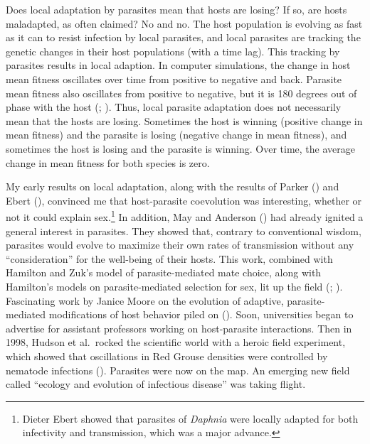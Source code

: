 \documentclass[
  letterpaper,
]{book}
\begin{document}
Does local adaptation by parasites mean that hosts are losing? If so,
are hosts maladapted, as often claimed? No and no. The host population
is evolving as fast as it can to resist infection by local parasites,
and local parasites are tracking the genetic changes in their host
populations (with a time lag). This tracking by parasites results in
local adaption. In computer simulations, the change in host mean fitness
oscillates over time from positive to negative and back. Parasite mean
fitness also oscillates from positive to negative, but it is 180 degrees
out of phase with the host (;
). Thus, local parasite
adaptation does not necessarily mean that the hosts are losing.
Sometimes the host is winning (positive change in mean fitness) and the
parasite is losing (negative change in mean fitness), and sometimes the
host is losing and the parasite is winning. Over time, the average
change in mean fitness for both species is zero.

My early results on local adaptation, along with the results of Parker
() and Ebert
(), convinced me that host-parasite
coevolution was interesting, whether or not it could explain
sex.\footnote{Dieter Ebert showed that parasites of \emph{Daphnia} were
  locally adapted for both infectivity and transmission, which was a
  major advance.} In addition, May and Anderson
() had already ignited a general interest
in parasites. They showed that, contrary to conventional wisdom,
parasites would evolve to maximize their own rates of transmission
without any ``consideration'' for the well-being of their hosts. This
work, combined with Hamilton and Zuk's model of parasite-mediated mate
choice, along with Hamilton's models on parasite-mediated selection for
sex, lit up the field (;
). Fascinating work by
Janice Moore on the evolution of adaptive, parasite-mediated
modifications of host behavior piled on
(). Soon, universities began to advertise
for assistant professors working on host-parasite interactions. Then in
1998, Hudson et al.~rocked the scientific world with a heroic field
experiment, which showed that oscillations in Red Grouse densities were
controlled by nematode infections ().
Parasites were now on the map. An emerging new field called ``ecology
and evolution of infectious disease'' was taking flight.
\end{document}
